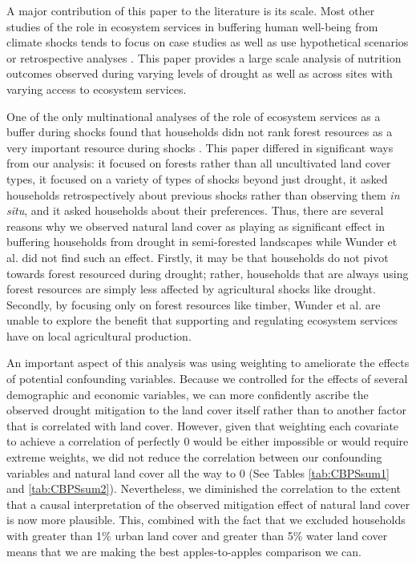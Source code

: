 \documentclass{article}
\begin{document}
A major contribution of this paper to the literature is its scale.  Most other studies of the role in ecosystem services in buffering human well-being from climate shocks tends to focus on case studies \cite{Debela2012} as well as use hypothetical scenarios \cite{Robledo2012} or retrospective analyses \cite{Muller2008}.  This paper provides a large scale analysis of nutrition outcomes observed during varying levels of drought as well as across sites with varying access to ecosystem services.

One of the only multinational analyses of the role of ecosystem services as a buffer during shocks found that households didn not rank forest resources as a very important resource during shocks \cite{Wunder2014}.  This paper differed in significant ways from our analysis: it focused on forests rather than all uncultivated land cover types, it focused on a variety of types of shocks beyond just drought, it asked households retrospectively about previous shocks rather than observing them \textit{in situ}, and it asked households about their preferences.  Thus, there are several reasons why we observed natural land cover as playing as significant effect in buffering households from drought in semi-forested landscapes while Wunder et al. did not find such an effect.  Firstly, it may be that households do not pivot towards forest resourced during drought; rather, households that are always using forest resources are simply less affected by agricultural shocks like drought.  Secondly, by focusing only on forest resources like timber, Wunder et al. are unable to explore the benefit that supporting and regulating ecosystem services have on local agricultural production.  

An important aspect of this analysis was using weighting to ameliorate the effects of potential confounding variables.  Because we controlled for the effects of several demographic and economic variables, we can more confidently ascribe the observed drought mitigation to the land cover itself rather than to another factor that is correlated with land cover.  However, given that weighting each covariate to achieve a correlation of perfectly 0 would be either impossible or would require extreme weights, we did not reduce the correlation between our confounding variables and natural land cover all the way to 0 (See Tables \ref{tab:CBPSsum1} and \ref{tab:CBPSsum2}).  Nevertheless, we diminished the correlation to the extent that a causal interpretation of the observed mitigation effect of natural land cover is now more plausible.  This, combined with the fact that we excluded households with greater than 1\% urban land cover and greater than 5\% water land cover means that we are making the best apples-to-apples comparison we can.
\end{document}

